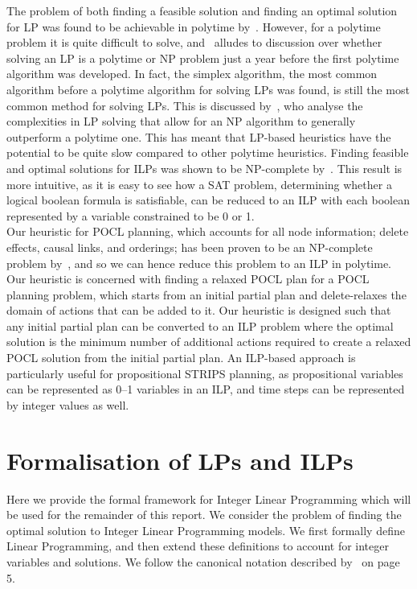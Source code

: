 The problem of both finding a feasible solution and finding an optimal solution for LP was found to be achievable in polytime by~\cite{Khachiyan1979PolynomialLP}. However, for a polytime problem it is quite difficult to solve, and~\cite{Lawler1978LPComplexityDebate} alludes to discussion over whether solving an LP is a polytime or NP problem just a year before the first polytime algorithm was developed. In fact, the simplex algorithm, the most common algorithm before a polytime algorithm for solving LPs was found, is still the most common method for solving LPs. This is discussed by~\cite{Traub1982ComplexityOfLP}, who analyse the complexities in LP solving that allow for an NP algorithm to generally outperform a polytime one. This has meant that LP-based heuristics have the potential to be quite slow compared to other polytime heuristics. Finding feasible and optimal solutions for ILPs was shown to be NP-complete by~\cite{Karp1972ReducibilityAmongCombinatorial}. This result is more intuitive, as it is easy to see how a SAT problem, determining whether a logical boolean formula is satisfiable, can be reduced to an ILP with each boolean represented by a variable constrained to be 0 or 1.\\

Our heuristic for POCL planning, which accounts for all node information; delete effects, causal links, and orderings; has been proven to be an NP-complete problem by~\cite{Bercher2021POCLComplexities}, and so we can hence reduce this problem to an ILP in polytime. Our heuristic is concerned with finding a relaxed POCL plan for a POCL planning problem, which starts from an initial partial plan and delete-relaxes the domain of actions that can be added to it. Our heuristic is designed such that any initial partial plan can be converted to an ILP problem where the optimal solution is the minimum number of additional actions required to create a relaxed POCL solution from the initial partial plan. An ILP-based approach is particularly useful for propositional STRIPS planning, as propositional variables can be represented as 0--1 variables in an ILP, and time steps can be represented by integer values as well.\\


\section{Formalisation of LPs and ILPs}
Here we provide the formal framework for Integer Linear Programming which will be used for the remainder of this report. We consider the problem of finding the optimal solution to Integer Linear Programming models. We first formally define Linear Programming, and then extend these definitions to account for integer variables and solutions. We follow the canonical notation described by~\cite{Karloff1991} on page 5.\\

